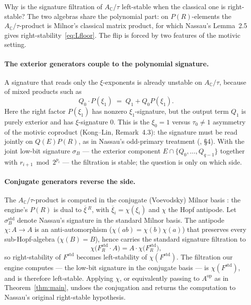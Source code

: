 \documentclass[11pt]{article}
\theoremstyle{definition}
\DeclareMathOperator{\op}{op}
\newcommand{\Actau}{A_{\mathbb C}/\tau}
\newcommand{\Aop}{A^{\op}}
\begin{document}
Why is the signature filtration of $\Actau$ left-stable when the classical one is
right-stable? The two algebras share the polynomial part: on $P(R)$-elements the
$\Actau$-product is Milnor's classical matrix product, for which Nassau's Lemma~2.5
gives right-stability~\eqref{eq:Lfloor}. The flip is forced by two features of the
motivic setting.

\paragraph{The exterior generators couple to the polynomial signature.}
A signature that reads only the $\xi$-exponents is already unstable on $\Actau$,
because of mixed products such as
\[
  Q_0\cdot P(\xi_1)\;=\;Q_1+Q_0P(\xi_1).
\]
Here the right factor $P(\xi_1)$ has nonzero $\xi_1$-signature, but the output term
$Q_1$ is purely exterior and has $\xi$-signature $0$. This is the $\xi_0=1$ versus
$\tau_0\ne1$ asymmetry of the motivic coproduct (Kong--Lin, Remark~4.3): the
signature must be read jointly on $Q(E)P(R)$, as in Nassau's odd-primary treatment
(\cite{nassau}, \S4). With the joint low-bit signature $\sigma_B$ --- the exterior
component $E\cap\{Q_0,\dots,Q_{q-1}\}$ together with $r_{i+1}\bmod 2^{p_i}$ --- the
filtration is stable; the question is only on which side.

\paragraph{Conjugate generators reverse the side.}
The $\Actau$-product is computed in the conjugate (Voevodsky) Milnor basis
\cite{konglin}: the engine's $P(R)$ is dual to $\overline{\xi}\,{}^R$, with
$\overline{\xi}_i=\chi(\xi_i)$ and $\chi$ the Hopf antipode. Let $\sigma_B^{\mathrm
{std}}$ denote Nassau's signature in the standard Milnor basis. The antipode
$\chi\colon A\to A$ is an anti-automorphism ($\chi(ab)=\chi(b)\chi(a)$) that
preserves every sub-Hopf-algebra ($\chi(B)=B$), hence carries the standard signature
filtration to
\[
  \chi\bigl(F_R^{\mathrm{std}}\cdot A\bigr)
  = A\cdot\chi\bigl(F_R^{\mathrm{std}}\bigr),
\]
so right-stability of $F^{\mathrm{std}}$ becomes left-stability of
$\chi(F^{\mathrm{std}})$. The filtration our engine computes --- the low-bit
signature in the conjugate basis --- is $\chi(F^{\mathrm{std}})$, and is therefore
left-stable. Applying $\chi$, or equivalently passing to $\Aop$ as in
Theorem~\ref{thm:main}, undoes the conjugation and returns the computation to
Nassau's original right-stable hypothesis.
\end{document}
